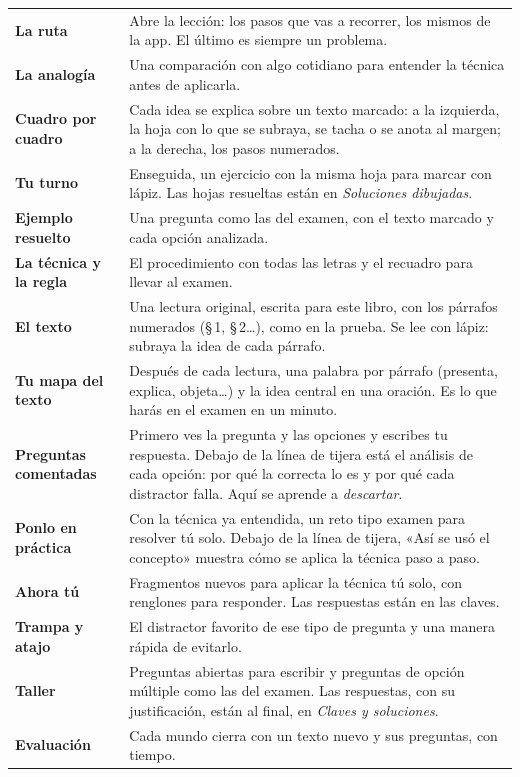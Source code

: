 \vspace{4pt}
\begin{tabularx}{\linewidth}{@{}>{\leavevmode\sffamily\small\bfseries\color{zolive}}p{27mm}X@{}}
La ruta & Abre la lección: los pasos que vas a recorrer, los mismos de la app. El último es siempre un problema.\\[4pt]
La analogía & Una comparación con algo cotidiano para entender la técnica antes de aplicarla.\\[4pt]
Cuadro por cuadro & Cada idea se explica sobre un texto marcado: a la izquierda, la hoja con lo que se subraya, se tacha o se
anota al margen; a la derecha, los pasos numerados.\\[4pt]
Tu turno & Enseguida, un ejercicio con la misma hoja para marcar con lápiz. Las hojas resueltas están en \emph{Soluciones
dibujadas}.\\[4pt]
Ejemplo resuelto & Una pregunta como las del examen, con el texto marcado y cada opción analizada.\\[4pt]
La técnica y la regla & El procedimiento con todas las letras y el recuadro para llevar al examen.\\[4pt]
El texto & Una lectura original, escrita para este libro, con los párrafos numerados (\S\,1, \S\,2…), como en la
prueba. Se lee con lápiz: subraya la idea de cada párrafo.\\[4pt]
Tu mapa del texto & Después de cada lectura, una palabra por párrafo (presenta, explica, objeta…) y la idea central en una
oración. Es lo que harás en el examen en un minuto.\\[4pt]
Preguntas comentadas & Primero ves la pregunta y las opciones y escribes tu respuesta. Debajo de la línea de tijera está el
análisis de cada opción: por qué la correcta lo es y por qué cada distractor falla. Aquí se aprende a \emph{descartar}.\\[4pt]
Ponlo en práctica & Con la técnica ya entendida, un reto tipo examen para resolver tú solo. Debajo de la línea de tijera,
«Así se usó el concepto» muestra cómo se aplica la técnica paso a paso.\\[4pt]
Ahora tú & Fragmentos nuevos para aplicar la técnica tú solo, con renglones para responder. Las respuestas están en las
claves.\\[4pt]
Trampa y atajo & El distractor favorito de ese tipo de pregunta y una manera rápida de evitarlo.\\[4pt]
Taller & Preguntas abiertas para escribir y preguntas de opción múltiple como las del examen. Las respuestas, con su
justificación, están al final, en \emph{Claves y soluciones}.\\[4pt]
Evaluación & Cada mundo cierra con un texto nuevo y sus preguntas, con tiempo.\\
\end{tabularx}

